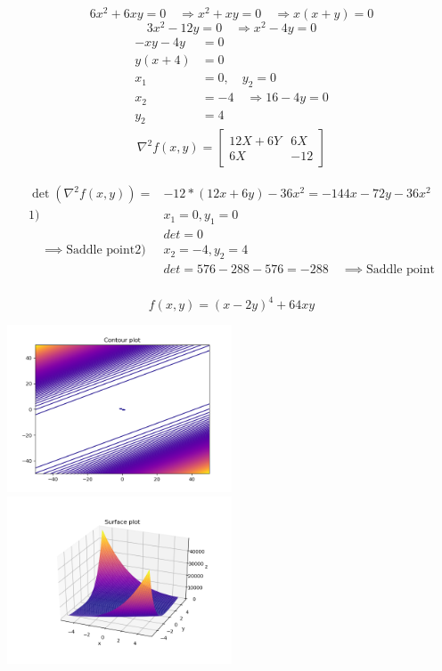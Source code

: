 \documentclass[12pt]{article}         %
\begin{document}
$$
6x^2+6xy=0 \quad\Rightarrow x^2+xy=0 \quad\Rightarrow x(x+y)=0 %
$$
$$
3x^2-12y=0 \quad\Rightarrow x^2-4y=0
$$
$$
\begin{aligned}
-xy-4y&=0\\
y(x+4)&=0\\
x_1&=0, \quad y_2=0\\
x_2&=-4 \quad\Rightarrow 16-4y=0\\
y_2&=4
\end{aligned}
$$
\begin{gather}
\nabla^2 f(x,y) = 
  \begin{bmatrix}
  12 X + 6Y &
   6X\\
   6X &
   -12 
   \end{bmatrix}
    \nonumber %
\end{gather}


$$
\begin{aligned}
\det\left(\nabla^2 f(x,y)\right)=&-12*(12x+6y) - 36x^2= -144x-72y-36x^2\\
1)\: &x_1=0, y_1=0\\
&det=0 \\  \quad\implies \text{Saddle point}%
2)\: &x_2=-4, y_2=4\\
&det=576-288-576=-288 \quad\implies \text{Saddle point}
\end{aligned}
$$\\

\begin{equation}
	f(x,y) = (x - 2y)^4 + 64xy
\end{equation}

\includegraphics[width=0.5\textwidth]{Figure_2}
\includegraphics[width=0.5\textwidth]{Surface_2}
\end{document}
